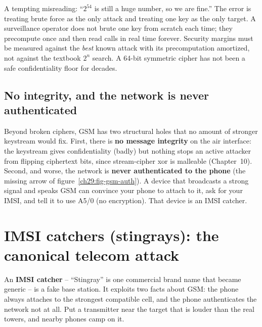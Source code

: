 \begin{trapbox}
A tempting misreading: ``$2^{54}$ is still a huge number, so we are fine.'' The error is treating brute force as the only attack and treating one key as the only target. A surveillance operator does not brute one key from scratch each time; they precompute once and then read calls in real time forever. Security margins must be measured against the \emph{best} known attack with its precomputation amortized, not against the textbook $2^{n}$ search. A 64-bit symmetric cipher has not been a safe confidentiality floor for decades.
\end{trapbox}

\subsection{No integrity, and the network is never authenticated}
\label{ch29:gsm-noint}

Beyond broken ciphers, GSM has two structural holes that no amount of stronger keystream would fix. First, there is \textbf{no message integrity} on the air interface: the keystream gives confidentiality (badly) but nothing stops an active attacker from flipping ciphertext bits, since stream-cipher xor is malleable (Chapter~10). Second, and worse, the network is \textbf{never authenticated to the phone} (the missing arrow of figure~\ref{ch29:fig-gsm-auth}). A device that broadcasts a strong signal and speaks GSM can convince your phone to attach to it, ask for your IMSI, and tell it to use A5/0 (no encryption). That device is an IMSI catcher.

\section{IMSI catchers (stingrays): the canonical telecom attack}
\label{ch29:imsi-catchers}

An \textbf{IMSI catcher} -- ``Stingray'' is one commercial brand name that became generic -- is a fake base station. It exploits two facts about GSM: the phone always attaches to the strongest compatible cell, and the phone authenticates the network not at all. Put a transmitter near the target that is louder than the real towers, and nearby phones camp on it.

